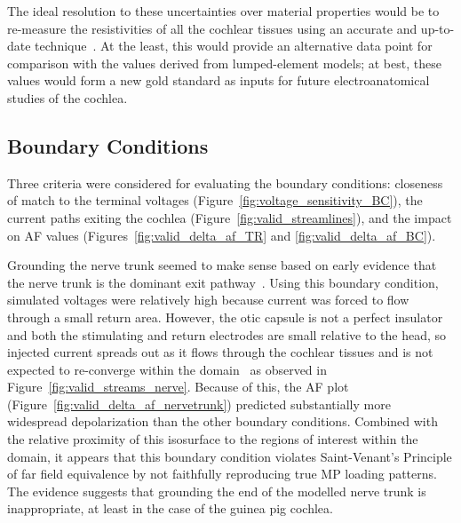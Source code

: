 The ideal resolution to these uncertainties over material properties would be to
re-measure the resistivities of all the cochlear tissues using an accurate and
up-to-date technique~\cite{spelman1990}. At the least, this would provide an
alternative data point for comparison with the values derived from
lumped-element models; at best, these values would form a new gold standard as
inputs for future electroanatomical studies of the cochlea.

\subsection{Boundary Conditions}
\label{sect:valid_bc_discussion}

Three criteria were considered for evaluating the boundary conditions: closeness
of match to the \invivo{} terminal voltages
(Figure~\ref{fig:voltage_sensitivity_BC}), the current paths exiting the cochlea
(Figure~\ref{fig:valid_streamlines}), and the impact on AF values
(Figures~\ref{fig:valid_delta_af_TR} and \ref{fig:valid_delta_af_BC}).

Grounding the nerve trunk seemed to make sense based on early evidence that the
nerve trunk is the dominant exit pathway~\cite{vonbekesy1960}. Using this
boundary condition, simulated voltages were relatively high because current was
forced to flow through a small return area. However, the otic capsule is not a
perfect insulator and both the stimulating and return electrodes are small
relative to the head, so injected current spreads out as it flows through the
cochlear tissues and is not expected to re-converge within the
domain~\cite{baker1989,tran2015} as observed in
Figure~\ref{fig:valid_streams_nerve}. Because of this, the AF plot
(Figure~\ref{fig:valid_delta_af_nervetrunk}) predicted substantially more
widespread depolarization than the other boundary conditions. Combined with the
relative proximity of this isosurface to the regions of interest within the
domain, it appears that this boundary condition violates Saint-Venant's
Principle of far field equivalence by not faithfully reproducing true MP loading
patterns. The evidence suggests that grounding the end of the modelled nerve
trunk is inappropriate, at least in the case of the guinea pig cochlea.

